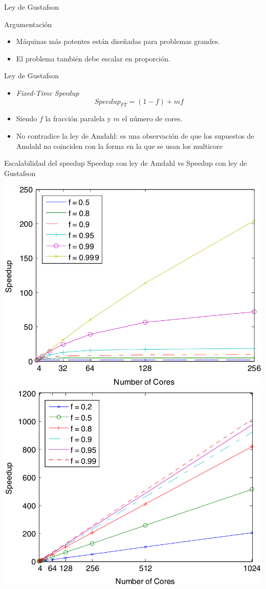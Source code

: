 \documentclass[utf8]{beamer}
\begin{document}
\begin{frame}[allowframebreaks]{Ley de Gustafson}
    \begin{block}{Argumentación}
        \begin{itemize}
            \item Máquinas más potentes están diseñadas para problemas grandes.
            \item El problema también debe escalar en proporción.
        \end{itemize}
    \end{block}
    \begin{block}{Ley de Gustafson}
        \begin{itemize}
            \item \emph{Fixed-Time Speedup}
            $$ Speedup_{FT} = (1 - f) + mf $$
            \item Siendo $f$ la fracción paralela y $m$ el número de cores.
            \item No contradice la ley de Amdahl: es una observación de que los supuestos de Amdahl no coinciden con la forma en la que se usan los multicore
        \end{itemize}
    \end{block}
    \begin{block}{Escalabilidad del speedup}
        Speedup con ley de Amdahl vs Speedup con ley de Gustafson
    \end{block}
    \begin{center}
        \includegraphics[width=.5\linewidth]{figures/fixedsize_speedup}
        \includegraphics[width=.5\linewidth]{figures/fixedtime_speedup}
    \end{center}
\end{frame}
\end{document}

